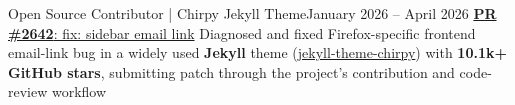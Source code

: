 
\subheading
    {Open Source Contributor | Chirpy Jekyll Theme}{January 2026 -- April 2026}
    {\href{https://github.com/cotes2020/jekyll-theme-chirpy/pull/2642}{\textbf{PR \#2642}: fix: sidebar email link}}{}
    \itemListStart
    \listItem{}
        {Diagnosed and fixed Firefox-specific frontend email-link bug in a widely used \textbf{Jekyll} theme (\href{https://github.com/cotes2020/jekyll-theme-chirpy/pull/2642}{jekyll-theme-chirpy}) with \textbf{10.1k+ GitHub stars}, submitting patch through the project's contribution and code-review workflow}
    \itemListEnd